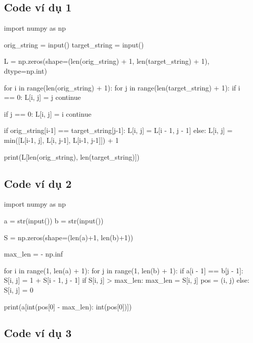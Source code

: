 \documentclass[14pt, a4paper]{article}
\theoremstyle{sltheorem}
\theoremstyle{soltheorem}
\begin{document}
    \subsection{Code ví dụ 1} \label{code-1-ex-2}

    \begin{python}
import numpy as np
        
orig_string = input()
target_string = input()
        
L = np.zeros(shape=(len(orig_string) + 1, len(target_string) + 1), dtype=np.int)
        
        
for i in range(len(orig_string) + 1):
    for j in range(len(target_string) + 1):
        if i == 0:
            L[i, j] = j
            continue
        
        if j == 0:
            L[i, j] = i
            continue
        
        if orig_string[i-1] == target_string[j-1]:
            L[i, j] = L[i - 1, j - 1]
        else:
            L[i, j] = min([L[i-1, j], L[i, j-1], L[i-1, j-1]]) + 1
        
        
print(L[len(orig_string), len(target_string)])
                \end{python}

    \subsection{Code ví dụ 2} \label{code-2-ex-2}

    \begin{python}

import numpy as np
        
a = str(input())
b = str(input())
        
        
S = np.zeros(shape=(len(a)+1, len(b)+1))
        
max_len = - np.inf
        
for i in range(1, len(a) + 1):
    for j in range(1, len(b) + 1):
        if a[i - 1] == b[j - 1]:
            S[i, j] = 1 + S[i - 1, j - 1]
            if S[i, j] > max_len:
                max_len = S[i, j]
                pos = (i, j)
        else:
            S[i, j] = 0
        
        
print(a[int(pos[0] - max_len): int(pos[0])])

    \end{python}

    \subsection{Code ví dụ 3} \label{code-3-ex-2}
\end{document}
